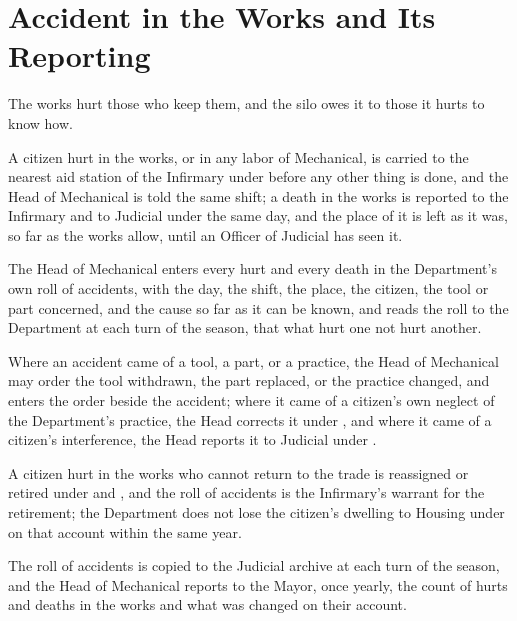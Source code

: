 \section{Accident in the Works and Its Reporting}
\label{sec:mechanical:accident-in-the-works-and-its-reporting}

The works hurt those who keep them, and the silo owes it to those it hurts to know how.

\begin{clauses}
\item A citizen hurt in the works, or in any labor of Mechanical, is carried to the nearest aid station of the Infirmary under  before any other thing is done, and the Head of Mechanical is told the same shift; a death in the works is reported to the Infirmary and to Judicial under  the same day, and the place of it is left as it was, so far as the works allow, until an Officer of Judicial has seen it.
\item The Head of Mechanical enters every hurt and every death in the Department's own roll of accidents, with the day, the shift, the place, the citizen, the tool or part concerned, and the cause so far as it can be known, and reads the roll to the Department at each turn of the season, that what hurt one not hurt another.
\item Where an accident came of a tool, a part, or a practice, the Head of Mechanical may order the tool withdrawn, the part replaced, or the practice changed, and enters the order beside the accident; where it came of a citizen's own neglect of the Department's practice, the Head corrects it under , and where it came of a citizen's interference, the Head reports it to Judicial under .
\item A citizen hurt in the works who cannot return to the trade is reassigned or retired under  and , and the roll of accidents is the Infirmary's warrant for the retirement; the Department does not lose the citizen's dwelling to Housing under  on that account within the same year.
\item The roll of accidents is copied to the Judicial archive at each turn of the season, and the Head of Mechanical reports to the Mayor, once yearly, the count of hurts and deaths in the works and what was changed on their account.
\end{clauses}
